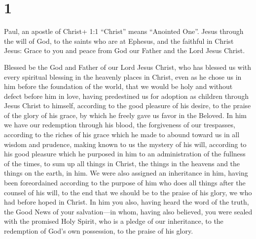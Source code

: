 \hypertarget{section}{%
\section{1}\label{section}}

 Paul, an apostle of Christ+ 1:1 ``Christ'' means ``Anointed
One''. Jesus through the will of God, to the saints who are at Ephesus,
and the faithful in Christ Jesus:  Grace to you and peace
from God our Father and the Lord Jesus Christ.

 Blessed be the God and Father of our Lord Jesus Christ, who
has blessed us with every spiritual blessing in the heavenly places in
Christ,  even as he chose us in him before the foundation of
the world, that we would be holy and without defect before him in love,
 having predestined us for adoption as children through
Jesus Christ to himself, according to the good pleasure of his desire,
 to the praise of the glory of his grace, by which he freely
gave us favor in the Beloved.  In him we have our redemption
through his blood, the forgiveness of our trespasses, according to the
riches of his grace  which he made to abound toward us in
all wisdom and prudence,  making known to us the mystery of
his will, according to his good pleasure which he purposed in him
 to an administration of the fullness of the times, to sum
up all things in Christ, the things in the heavens and the things on the
earth, in him.  We were also assigned an inheritance in
him, having been foreordained according to the purpose of him who does
all things after the counsel of his will,  to the end that
we should be to the praise of his glory, we who had before hoped in
Christ.  In him you also, having heard the word of the
truth, the Good News of your salvation---in whom, having also believed,
you were sealed with the promised Holy Spirit,  who is a
pledge of our inheritance, to the redemption of God's own possession, to
the praise of his glory.

